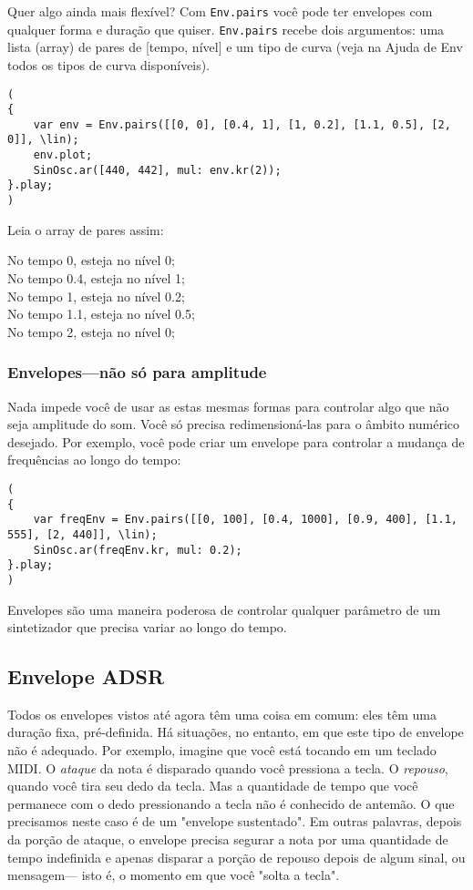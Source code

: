 Quer algo ainda mais flexível? Com \texttt{Env.pairs} você pode ter envelopes com qualquer forma e duração que quiser. \texttt{Env.pairs} recebe dois argumentos: uma lista (array) de pares de [tempo, nível] e um tipo de curva (veja na Ajuda de Env todos os tipos de curva disponíveis).

 
\begin{lstlisting}[style=SuperCollider-IDE, basicstyle=\scttfamily\footnotesize]
(
{
	var env = Env.pairs([[0, 0], [0.4, 1], [1, 0.2], [1.1, 0.5], [2, 0]], \lin);
	env.plot;
	SinOsc.ar([440, 442], mul: env.kr(2));
}.play;
)
\end{lstlisting}
 
Leia o array de pares assim:
\begin{center}
No tempo 0, esteja no nível 0;\\
No tempo 0.4, esteja no nível 1;\\
No tempo 1, esteja no nível 0.2;\\
No tempo 1.1, esteja no nível 0.5;\\
No tempo 2, esteja no nível 0;
\end{center}

\subsubsection{Envelopes---não só para amplitude}

Nada impede você de usar as estas mesmas formas para controlar algo que não seja amplitude do som. Você só precisa redimensioná-las para o âmbito numérico desejado. Por exemplo, você pode criar um envelope para controlar a mudança de frequências ao longo do tempo:

\begin{lstlisting}[style=SuperCollider-IDE, basicstyle=\scttfamily\footnotesize]
(
{
	var freqEnv = Env.pairs([[0, 100], [0.4, 1000], [0.9, 400], [1.1, 555], [2, 440]], \lin);
	SinOsc.ar(freqEnv.kr, mul: 0.2);
}.play;
)
\end{lstlisting}

Envelopes são uma maneira poderosa de controlar qualquer parâmetro de um sintetizador que precisa variar ao longo do tempo.

\subsection{Envelope ADSR}

Todos os envelopes vistos até agora têm uma coisa em comum: eles têm uma duração fixa, pré-definida. Há situações, no entanto, em que este tipo de envelope não é adequado. Por exemplo, imagine que você está tocando em um teclado MIDI. O \textit{ataque} da nota é disparado quando você pressiona a tecla. O \textit{repouso}, quando você tira seu dedo da tecla. Mas a quantidade de tempo que você permanece com o dedo pressionando a tecla não é conhecido de antemão. O que precisamos neste caso é de um "envelope sustentado". Em outras palavras, depois da porção de ataque, o envelope precisa segurar a nota por uma quantidade de tempo indefinida e apenas disparar a porção de repouso depois de algum sinal, ou mensagem--- isto é, o momento em que você "solta a tecla".

